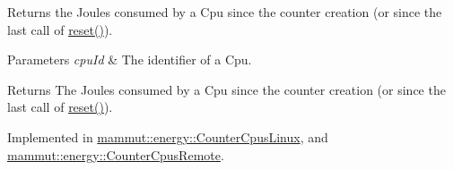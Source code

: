 Returns the Joules consumed by a Cpu since the counter creation (or since the last call of \hyperlink{classmammut_1_1energy_1_1CounterCpus_ac3d2b3c06119c5e4f077b05689b2374a}{reset()}). 
\begin{DoxyParams}{Parameters}
{\em cpu\-Id} & The identifier of a Cpu. \\
\hline
\end{DoxyParams}
\begin{DoxyReturn}{Returns}
The Joules consumed by a Cpu since the counter creation (or since the last call of \hyperlink{classmammut_1_1energy_1_1CounterCpus_ac3d2b3c06119c5e4f077b05689b2374a}{reset()}). 
\end{DoxyReturn}


Implemented in \hyperlink{classmammut_1_1energy_1_1CounterCpusLinux_a0d02d3433187bdc382ca4f5aa14f17fe}{mammut\-::energy\-::\-Counter\-Cpus\-Linux}, and \hyperlink{classmammut_1_1energy_1_1CounterCpusRemote_a1c55fc9f3bbcaed7d16e526175eca00c}{mammut\-::energy\-::\-Counter\-Cpus\-Remote}.

